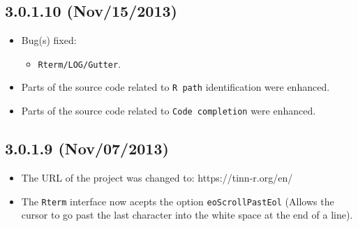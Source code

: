 \subsection*{3.0.1.10 (Nov/15/2013)}
\begin{itemize}
  \item Bug(s) fixed:
    \begin{itemize}
      \item \texttt{Rterm/LOG/Gutter}.
    \end{itemize}
  \item Parts of the source code related to \texttt{R path} identification were enhanced.
  \item Parts of the source code related to \texttt{Code completion} were enhanced.
\end{itemize}


\subsection*{3.0.1.9 (Nov/07/2013)}
\begin{itemize}
  \item The URL of the project was changed to: https://tinn-r.org/en/
  \item The \texttt{Rterm} interface now acepts the option \texttt{eoScrollPastEol}
   (Allows the cursor to go past the last character into the white space at the end of a line).
\end{itemize}


